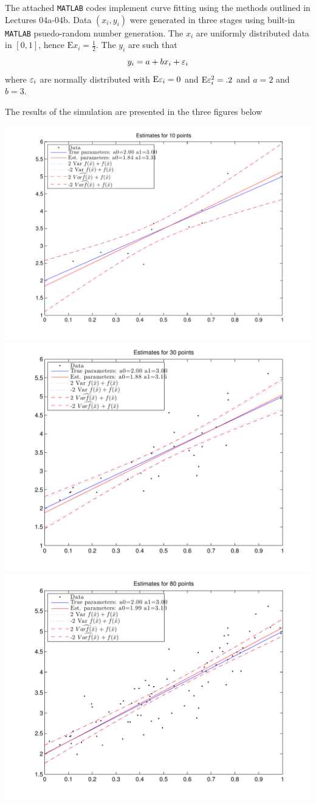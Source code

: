 \documentclass{homework}
\begin{document}
\begin{solution}
  The attached \texttt{MATLAB} codes implement curve fitting using the methods outlined in Lectures 04a-04b.  
  Data $(x_i,y_i)$ were generated in three stages using built-in \texttt{MATLAB} psuedo-random number generation. The $x_i$ are uniformly distributed data in $[0,1]$, hence $\mathrm E x_i = \frac 12$. The $y_i$ are such that 
  $$
    y_i = a + bx_i + \varepsilon_i
  $$
  where $\varepsilon_i$ are normally distributed with $\mathrm E \varepsilon_i = 0$ and $\mathrm E \varepsilon_i^2 = .2$ and $a= 2$ and $b = 3$.


  The results of the simulation are presented in the three figures below

    \hspace{-3em}
    \includegraphics[width=.3\textwidth]{ten_point.pdf}
    \includegraphics[width=.3\textwidth]{thirty_points.pdf}
    \includegraphics[width=.3\textwidth]{eighty_points.pdf}
\end{solution}
\end{document}
